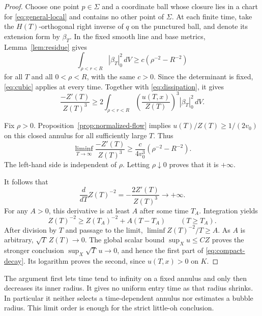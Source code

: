 \documentclass[11pt]{amsart}
\theoremstyle{definition}
\theoremstyle{remark}
\begin{document}
\begin{proof}
Choose one point $p\in\Sigma$ and a coordinate ball whose closure
lies in a chart for \eqref{eq:general-local} and contains no other
point of $\Sigma$. At each finite time, take the $H(T)$-orthogonal
right inverse of $q$ on the punctured ball, and denote its extension form
by $\beta_T$. In the fixed smooth line and base metrics,
Lemma~\ref{lem:residue} gives
\begin{equation}\label{eq:moving-residue}
 \int_{\rho<r<R}|\beta_T|_0^2\,dV
 \ge c(\rho^{-2}-R^{-2})
\end{equation}
for all $T$ and all $0<\rho<R$, with the same $c>0$.
Since the determinant is fixed, \eqref{eq:cubic} applies at every time.
Together with \eqref{eq:dissipation}, it gives
\begin{equation}\label{eq:normalized-dissipation}
 \frac{-Z'(T)}{Z(T)^3}
 \ge 2\int_{\rho<r<R}
       \left(\frac{u(T,x)}{Z(T)}\right)^3|\beta_T|_0^2\,dV.
\end{equation}

Fix $\rho>0$. Proposition~\ref{prop:normalized-flow} implies
$u(T)/Z(T)\ge1/(2v_0)$ on this closed annulus for all sufficiently
large $T$. Thus
\begin{equation}\label{eq:fixed-annulus-limit}
 \liminf_{T\to\infty}\frac{-Z'(T)}{Z(T)^3}
 \ge \frac{c}{4v_0^3}(\rho^{-2}-R^{-2}).
\end{equation}
The left-hand side is independent of $\rho$. Letting $\rho\downarrow0$
proves that it is $+\infty$.

It follows that
\[
 \frac{d}{dT}Z(T)^{-2}=-\frac{2Z'(T)}{Z(T)^3}\longrightarrow+\infty.
\]
For any $A>0$, this derivative is at least $A$ after some time $T_A$.
Integration yields
\[
 Z(T)^{-2}\ge Z(T_A)^{-2}+A(T-T_A)\qquad(T\ge T_A).
\]
After division by $T$ and passage to the limit, $\liminf Z(T)^{-2}/T\ge A$.
As $A$ is arbitrary, $\sqrt T\,Z(T)\to0$.
The global scalar bound $\sup_Xu\le CZ$ proves the stronger
conclusion $\sup_X\sqrt T\,u\to0$, and hence the first part of
\eqref{eq:compact-decay}. Its logarithm proves the second, since
$u(T,x)>0$ on $K$.
\end{proof}

The argument first lets time tend to infinity on a fixed annulus and
only then decreases its inner radius. It gives no uniform entry time
as that radius shrinks. In particular it neither selects a time-dependent
annulus nor estimates a bubble radius. This limit order is enough for
the strict little-oh conclusion.
\end{document}
